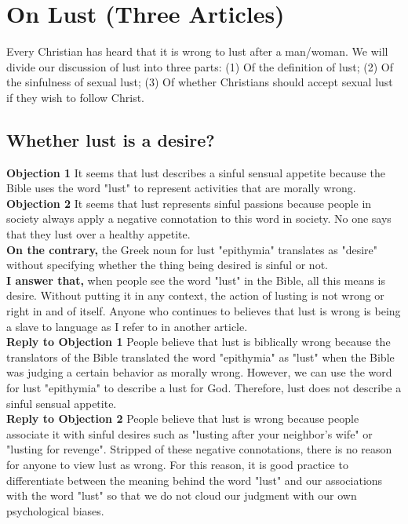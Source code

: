 \documentclass[a4paper, parskip=full, 15pt]{article}
\begin{document}
\section{On Lust (Three Articles)}
Every Christian has heard that it is wrong to lust after a man/woman. We will divide our discussion of lust into three parts: (1) Of the definition of lust; (2) Of the sinfulness of sexual lust; (3) Of whether Christians should accept sexual lust if they wish to follow Christ.

\subsection{Whether lust is a desire?}
\textbf{Objection 1} It seems that lust describes a sinful sensual appetite because the Bible uses the word "lust" to represent activities that are morally wrong. \\
\textbf{Objection 2} It seems that lust represents sinful passions because people in society always apply a negative connotation to this word in society. No one says that they lust over a healthy appetite. \\
\textbf{On the contrary,} the Greek noun for lust "epithymia" translates as "desire" without specifying whether the thing being desired is sinful or not. \\
\textbf{I answer that,} when people see the word "lust" in the Bible, all this means is desire. Without putting it in any context, the action of lusting is not wrong or right in and of itself. Anyone who continues to believes that lust is wrong is being a slave to language as I refer to in another article. \\
\textbf{Reply to Objection 1} People believe that lust is biblically wrong because the translators of the Bible translated the word "epithymia" as "lust" when the Bible was judging a certain behavior as morally wrong. However, we can use the word for lust "epithymia" to describe a lust for God. Therefore, lust does not describe a sinful sensual appetite. \\
\textbf{Reply to Objection 2} People believe that lust is wrong because people associate it with sinful desires such as "lusting after your neighbor's wife" or "lusting for revenge". Stripped of these negative connotations, there is no reason for anyone to view lust as wrong. For this reason, it is good practice to differentiate between the meaning behind the word "lust" and our associations with the word "lust" so that we do not cloud our judgment with our own psychological biases.
\end{document}

